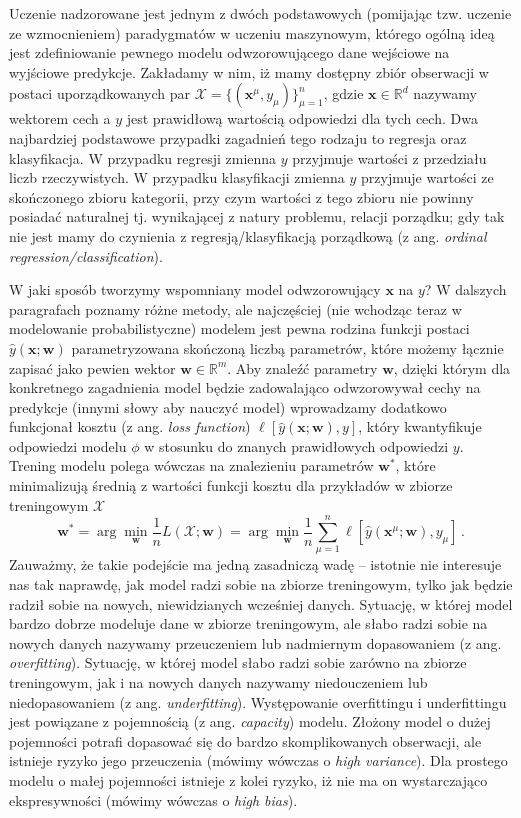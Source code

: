 \documentclass{myclass}
\numberwithin{equation}{subsection}
\begin{document}
Uczenie nadzorowane jest jednym z dwóch podstawowych (pomijając tzw. uczenie ze wzmocnieniem)
paradygmatów w uczeniu maszynowym, którego ogólną ideą jest zdefiniowanie pewnego modelu
odwzorowującego dane wejściowe na wyjściowe predykcje. Zakładamy w nim, iż mamy dostępny zbiór
obserwacji w postaci uporządkowanych par \(\mathcal{X} = \{(\mathbf{x}^\mu, y_\mu)\}_{\mu=1}^n\),
gdzie \(\mathbf{x} \in \mathbb{R}^d\) nazywamy wektorem cech a \(y\) jest prawidłową wartością
odpowiedzi dla tych cech. Dwa najbardziej podstawowe przypadki zagadnień tego rodzaju to regresja
oraz klasyfikacja. W przypadku regresji zmienna \(y\) przyjmuje wartości z przedziału liczb
rzeczywistych. W przypadku klasyfikacji zmienna \(y\) przyjmuje wartości ze skończonego zbioru
kategorii, przy czym wartości z tego zbioru nie powinny posiadać naturalnej tj. wynikającej z natury
problemu, relacji porządku; gdy tak nie jest mamy do czynienia z regresją/klasyfikacją porządkową (z
ang. \textit{ordinal regression/classification}).

W jaki sposób tworzymy wspomniany model odwzorowujący \(\mathbf{x}\) na \(y\)? W dalszych
paragrafach poznamy różne metody, ale najczęściej (nie wchodząc teraz w modelowanie
probabilistyczne) modelem jest pewna rodzina funkcji postaci \(\hat{y}(\mathbf{x}; \mathbf{w})\)
parametryzowana skończoną liczbą parametrów, które możemy łącznie zapisać jako pewien wektor
\(\mathbf{w} \in \mathbb{R}^m\). Aby znaleźć parametry \(\mathbf{w}\), dzięki którym dla konkretnego
zagadnienia model będzie zadowalająco odwzorowywał cechy na predykcje (innymi słowy aby nauczyć
model) wprowadzamy dodatkowo funkcjonał kosztu (z ang. \textit{loss function})
\(\ell[\hat{y}(\mathbf{x};\mathbf{w}), y]\), który kwantyfikuje odpowiedzi modelu \(\phi\) w
stosunku do znanych prawidłowych odpowiedzi \(y\). Trening modelu polega wówczas na znalezieniu
parametrów \(\mathbf{w}^*\), które minimalizują średnią z wartości funkcji kosztu dla przykładów w
zbiorze treningowym \(\mathcal{X}\)
\begin{equation}
    \mathbf{w}^* = \arg\min_{\mathbf{w}} \frac{1}{n}L(\mathcal{X};\mathbf{w}) = \arg\min_{\mathbf{w}} \frac{1}{n}\sum_{\mu=1}^n \ell[\hat{y}(\mathbf{x}^\mu;\mathbf{w}), y_\mu]\,.
\end{equation}
Zauważmy, że takie podejście ma jedną zasadniczą wadę -- istotnie nie interesuje nas tak naprawdę,
jak model radzi sobie na zbiorze treningowym, tylko jak będzie radził sobie na nowych, niewidzianych
wcześniej danych. Sytuację, w której model bardzo dobrze modeluje dane w zbiorze treningowym, ale
słabo radzi sobie na nowych danych nazywamy przeuczeniem lub nadmiernym dopasowaniem (z ang.
\textit{overfitting}). Sytuację, w której model słabo radzi sobie zarówno na zbiorze treningowym,
jak i na nowych danych nazywamy niedouczeniem lub niedopasowaniem (z ang. \textit{underfitting}).
Występowanie overfittingu i underfittingu jest powiązane z pojemnością (z ang. \textit{capacity})
modelu. Złożony model o dużej pojemności potrafi dopasować się do bardzo skomplikowanych obserwacji,
ale istnieje ryzyko jego przeuczenia (mówimy wówczas o \textit{high variance}). Dla prostego modelu
o małej pojemności istnieje z kolei ryzyko, iż nie ma on wystarczająco ekspresywności (mówimy
wówczas o \textit{high bias}).
 
\end{document}
